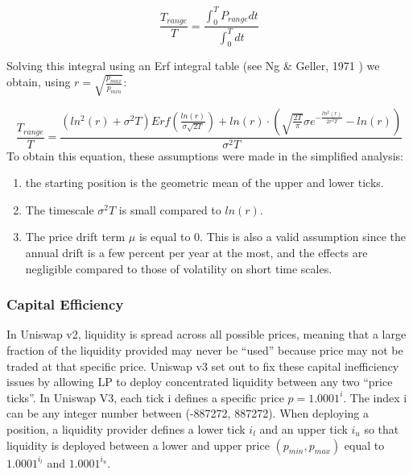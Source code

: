 \documentclass{article}
\begin{document}
\begin{equation}
    \frac{T_{range}}{T}=\frac{\int_0^T P_{range}dt}{\int_0^Tdt}
\end{equation}

Solving this integral using an Erf integral table (see Ng \& Geller, 1971 \cite{ng1971}) we obtain, using $r = \sqrt{\frac{p_{max}}{p_{min}}}$:

\begin{equation}
    \frac{T_{range}}{T}=\frac{(ln^2(r) + \sigma^2T)Erf(\frac{ln(r)}{\sigma\sqrt{2T}})+ln(r)\cdot\left(\sqrt{\frac{2T}{\pi}}\sigma e^{-\frac{ln^2(r)}{2r^2T}}-ln(r)\right)}{\sigma^2T}
\end{equation}
To obtain this equation, these assumptions were made in the simplified analysis:
\begin{enumerate}
    \item the starting position is the geometric mean of the upper and lower ticks.
    \item The timescale $\sigma^2T$ is small compared to $ln(r)$.
    \item The price drift term $\mu$ is equal to 0. This is also a valid assumption since the annual drift is a few percent per year at the most, and the effects are negligible compared to those of volatility on short time scales.
\end{enumerate}

\subsubsection{Capital Efficiency}
In Uniswap v2, liquidity is spread across all possible prices, meaning that a large fraction of the liquidity provided may never be “used” because price may not be traded at that specific price. Uniswap v3 set out to fix these capital inefficiency issues by allowing LP to deploy concentrated liquidity between any two “price ticks”.
In Uniswap V3, each tick i defines a specific price $p=1.0001^i$. The index i can be any integer number between (-887272, 887272). When deploying a position, a liquidity provider defines a lower tick $i_l$ and an upper tick $i_u$ so that liquidity is deployed between a lower and upper price $(p_{min},p_{max})$ equal to $1.0001^{i_l}$ and $1.0001^{i_u}$.
\end{document}
